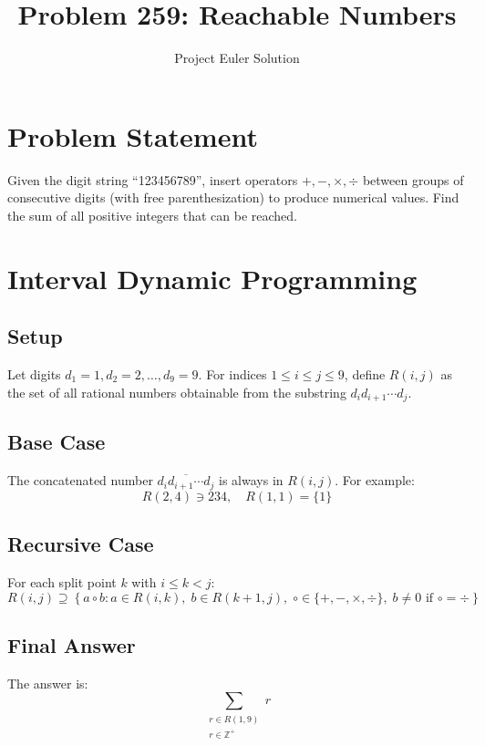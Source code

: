\documentclass[12pt]{article}
\title{Problem 259: Reachable Numbers}
\author{Project Euler Solution}
\date{}
\begin{document}
\maketitle

\section{Problem Statement}

Given the digit string ``123456789'', insert operators $+, -, \times, \div$ between groups of consecutive digits (with free parenthesization) to produce numerical values. Find the sum of all positive integers that can be reached.

\section{Interval Dynamic Programming}

\subsection{Setup}

Let digits $d_1 = 1, d_2 = 2, \ldots, d_9 = 9$. For indices $1 \le i \le j \le 9$, define $R(i,j)$ as the set of all rational numbers obtainable from the substring $d_i d_{i+1} \cdots d_j$.

\subsection{Base Case}

The concatenated number $\overline{d_i d_{i+1} \cdots d_j}$ is always in $R(i,j)$. For example:
\[
R(2,4) \ni 234, \quad R(1,1) = \{1\}
\]

\subsection{Recursive Case}

For each split point $k$ with $i \le k < j$:
\[
R(i,j) \supseteq \left\{ a \circ b : a \in R(i,k),\; b \in R(k+1,j),\; \circ \in \{+,-,\times,\div\},\; b \ne 0 \text{ if } \circ = \div \right\}
\]

\subsection{Final Answer}

The answer is:
\[
\sum_{\substack{r \in R(1,9) \\ r \in \mathbb{Z}^+}} r
\]
\end{document}
